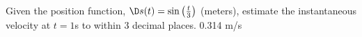 {Given the position function, $\D s(t)=\sin\left(\frac{t}{3}\right)$ (meters), estimate the instantaneous velocity at $t=1$s to within 3 decimal places.}
{0.314 m/s}